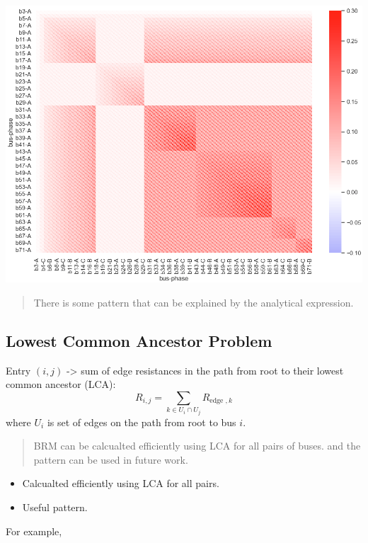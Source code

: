 \documentclass[
]{book}
\providecommand{\tightlist}{%
  \setlength{\itemsep}{0pt}\setlength{\parskip}{0pt}}
\begin{document}
\begin{center}\includegraphics{Pictures/figHeatmapBRM} \end{center}

\begin{quote}
There is some pattern that can be explained by the analytical expression.
\end{quote}

\hypertarget{LCA}{%
\subsection*{Lowest Common Ancestor Problem}\label{LCA}}

Entry \((i, j)\) -\textgreater{} sum of edge resistances in the path from root to their lowest
common ancestor (LCA):
\[
R_{i, j}=\sum_{k \in U_{i} \cap U_{j}} R_{\text {edge }, k}
\]
where \(U_{i}\) is set of edges on the path from root to bus \(i\).

\begin{quote}
BRM can be calcualted efficiently using LCA for all pairs of buses. and the
pattern can be used in future work.
\end{quote}

\begin{itemize}
\tightlist
\item
  Calcualted efficiently using LCA for all pairs.
\item
  Useful pattern.
\end{itemize}

For example,
\end{document}
